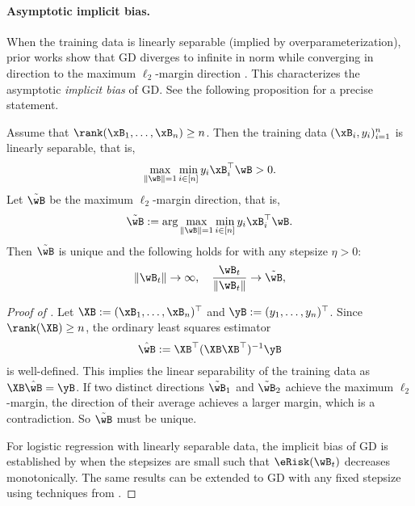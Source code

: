 \documentclass[11pt]{article}
\begin{document}
\paragraph{Asymptotic implicit bias.}
When the training data is linearly separable (implied by overparameterization), prior works show that GD diverges to infinite in norm while converging in direction to the maximum $\ell_2$-margin direction \citep{soudry2018implicit,ji2018risk}. This characterizes the asymptotic \emph{implicit bias} of GD. See the following proposition for a precise statement.

\begin{proposition}\label{prop:implicit-bias-asymp}
Assume that $\rank(\xB_1,\dots,\xB_n) \ge n$. Then the training data $(\xB_i, y_i)_{i=1}^n$ is linearly separable, that is, \[\max_{\|\wB\|=1} \min_{i\in [n]} y_i\xB_i^\top \wB > 0.\] 
Let $\tilde \wB$ be the maximum $\ell_2$-margin direction, that is,
\begin{align*}
    \tilde \wB := \arg\max_{\|\wB\|=1} \min_{i\in [n]} y_i\xB_i^\top \wB.
\end{align*}
Then $\tilde\wB$ is unique and the following holds for  with any stepsize $\eta>0$:
\begin{align*}
\|\wB_t\|\to \infty,\quad 
\frac{\wB_t}{\|\wB_t\|}\to \tilde\wB,
\end{align*}
\end{proposition}
\begin{proof}[Proof of ]
Let $\XB := (\xB_1,\dots,\xB_n)^\top$ and $\yB := (y_1,\dots,y_n)^\top$. 
Since $\rank(\XB) \ge n$, the ordinary least squares estimator
\[\hat \wB:= \XB^\top (\XB\XB^\top)^{-1}\yB\] is well-defined. This implies the linear separability of the training data as $\XB \hat \wB = \yB$. If two distinct directions $\tilde\wB_1$ and $\tilde\wB_2$ achieve the maximum $\ell_2$-margin, the direction of their average achieves a larger margin, which is a contradiction. So $\tilde\wB$ must be unique.

For logistic regression with linearly separable data, the implicit bias of GD is established by \citet{soudry2018implicit,ji2018risk} when the stepsizes are small such that $\eRisk(\wB_t)$ decreases monotonically. The same results can be extended to GD with any fixed stepsize using techniques from \citep{wu2023implicit,wu2024large}.
\end{proof}
\end{document}
